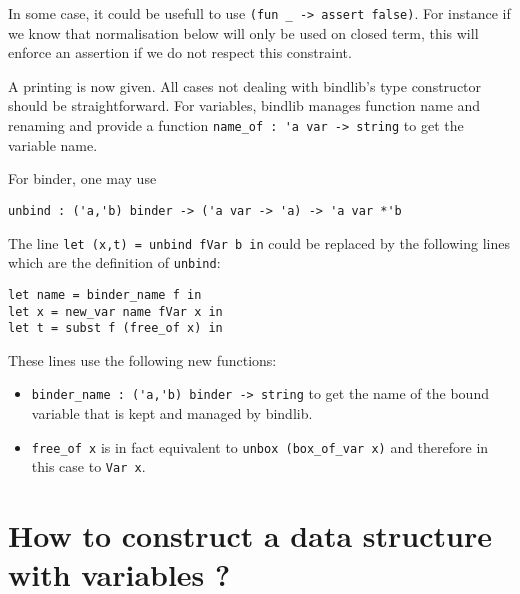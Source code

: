 \documentclass[11pt]{article}
\begin{document}
In some case, it could be usefull to use \verb!(fun _ -> assert false)!.
For instance if we know that normalisation below will only be
used on closed term, this will enforce an assertion if we do not
respect this constraint.

A printing is now given. All cases not
dealing with bindlib's type constructor should be straightforward. For
variables, bindlib manages function name and renaming and provide a
function \verb!name_of : 'a var -> string! to get the variable name.

For binder, one may use
\begin{lstlisting}
unbind : ('a,'b) binder -> ('a var -> 'a) -> 'a var *'b
\end{lstlisting}


The line \verb!let (x,t) = unbind fVar b in! could be replaced by the
following lines which are the definition of \verb#unbind#:
\begin{lstlisting}
let name = binder_name f in
let x = new_var name fVar x in
let t = subst f (free_of x) in
\end{lstlisting}

These lines use the following new functions:

\begin{itemize}
\item \verb#binder_name : ('a,'b) binder -> string# to get the name
  of the bound variable that is kept and managed by bindlib.


\item \verb#free_of x# is in fact equivalent to
  \verb#unbox (box_of_var x)# and therefore in this case to \verb#Var x#.

\end{itemize}


\section{How to construct a data structure with variables ?}
\end{document}
